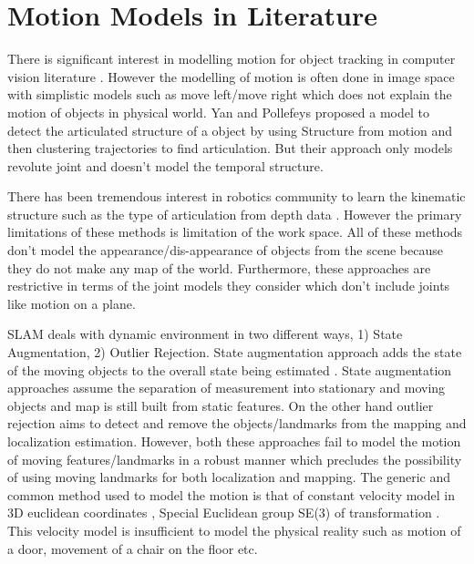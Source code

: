 \documentclass[10pt,twocolumn,letterpaper]{article}
\begin{document}
\section{Motion Models in Literature}
There is significant interest in modelling motion for object tracking in computer vision literature \cite{cifuentes2012motion}. However the modelling of motion is often done in image space with simplistic models such as move left/move right which does not explain the motion of objects in physical world. Yan and Pollefeys \cite{yan2006automatic} proposed a model to detect the articulated structure of a object by using Structure from motion and then clustering trajectories to find articulation. But their approach only models revolute joint and doesn't model the temporal structure. 

There has been tremendous interest in robotics community to learn the kinematic structure such as the type of articulation from depth data \cite{sturm2010vision,katz2013interactive,katz2014interactive}. However the primary limitations of these methods is limitation of the work space. All of these methods don't model the appearance/dis-appearance of objects from the scene because they do not make any map of the world. Furthermore, these approaches are restrictive in terms of the joint models they consider which don't include joints like motion on a plane.

SLAM deals with dynamic environment in two different ways, 1) State Augmentation, 2) Outlier Rejection. State augmentation approach adds the state of the moving objects to the overall state being estimated \cite{wang2003online}. State augmentation approaches \cite{wang2003online,kundu2011realtime} assume the separation of measurement into stationary and moving objects and map is still built from static features.  On the other hand outlier rejection aims to detect and remove the objects/landmarks from the mapping and localization estimation. However, both these approaches fail to model the motion of moving features/landmarks in a robust manner which precludes the possibility of using moving landmarks for both localization and mapping.  The generic and common method used to model the motion is that of constant velocity model in 3D euclidean coordinates \cite{wang2003online}, Special Euclidean group SE(3) of transformation \cite{kundu2011realtime}. This velocity model is insufficient to model the physical reality such as motion of a door, movement of a chair on the floor etc.
\end{document}
